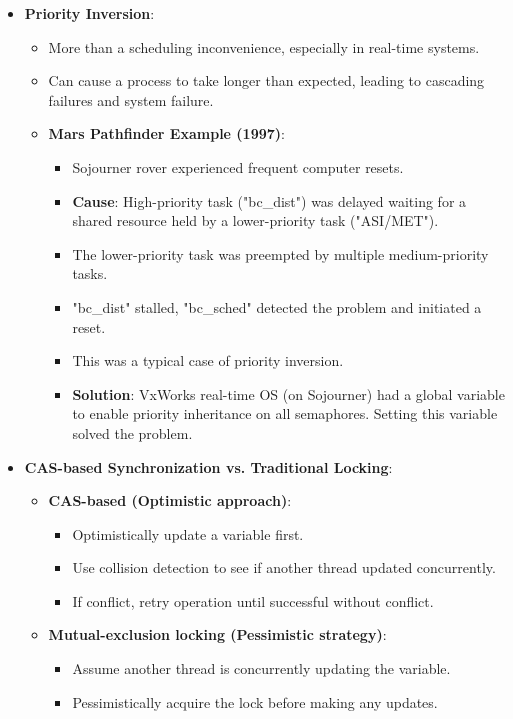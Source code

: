 \begin{itemize}
    \item \textbf{Priority Inversion}:
    \begin{itemize}
        \item More than a scheduling inconvenience, especially in real-time systems.
        \item Can cause a process to take longer than expected, leading to cascading failures and system failure.
        \item \textbf{Mars Pathfinder Example (1997)}:
        \begin{itemize}
            \item Sojourner rover experienced frequent computer resets.
            \item \textbf{Cause}: High-priority task ("bc\_dist") was delayed waiting for a shared resource held by a lower-priority task ("ASI/MET").
            \item The lower-priority task was preempted by multiple medium-priority tasks.
            \item "bc\_dist" stalled, "bc\_sched" detected the problem and initiated a reset.
            \item This was a typical case of priority inversion.
            \item \textbf{Solution}: VxWorks real-time OS (on Sojourner) had a global variable to enable priority inheritance on all semaphores. Setting this variable solved the problem.
        \end{itemize}
    \end{itemize}

    \item \textbf{CAS-based Synchronization vs. Traditional Locking}:
    \begin{itemize}
        \item \textbf{CAS-based (Optimistic approach)}:
        \begin{itemize}
            \item Optimistically update a variable first.
            \item Use collision detection to see if another thread updated concurrently.
            \item If conflict, retry operation until successful without conflict.
        \end{itemize}
        \item \textbf{Mutual-exclusion locking (Pessimistic strategy)}:
        \begin{itemize}
            \item Assume another thread is concurrently updating the variable.
            \item Pessimistically acquire the lock before making any updates.
        \end{itemize}
    \end{itemize}


\end{itemize}
